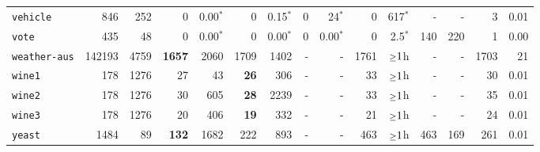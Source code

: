 \begin{tabular}{lccrrrrrrrrrrrr}
\texttt{vehicle} & \multicolumn{1}{r}{846} & \multicolumn{1}{r}{252}  & 0 & 0.00$^*$ & 0 & 0.15$^*$ & 0 & 24$^*$ & 0 & 617$^*$ & - & - & 3 & 0.01\\
\texttt{vote} & \multicolumn{1}{r}{435} & \multicolumn{1}{r}{48}  & 0 & 0.00$^*$ & 0 & 0.00$^*$ & 0 & 0.00$^*$ & 0 & 2.5$^*$ & 140 & 220 & 1 & 0.00\\
\texttt{weather-aus} & \multicolumn{1}{r}{142193} & \multicolumn{1}{r}{4759}  & \textbf{1657} & 2060 & 1709 & 1402 & - & - & 1761 & $\mathsmaller{\geq}1$h & - & - & 1703 & 21\\
\texttt{wine1} & \multicolumn{1}{r}{178} & \multicolumn{1}{r}{1276}  & 27 & 43 & \textbf{26} & 306 & - & - & 33 & $\mathsmaller{\geq}1$h & - & - & 30 & 0.01\\
\texttt{wine2} & \multicolumn{1}{r}{178} & \multicolumn{1}{r}{1276}  & 30 & 605 & \textbf{28} & 2239 & - & - & 33 & $\mathsmaller{\geq}1$h & - & - & 35 & 0.01\\
\texttt{wine3} & \multicolumn{1}{r}{178} & \multicolumn{1}{r}{1276}  & 20 & 406 & \textbf{19} & 332 & - & - & 21 & $\mathsmaller{\geq}1$h & - & - & 24 & 0.01\\
\texttt{yeast} & \multicolumn{1}{r}{1484} & \multicolumn{1}{r}{89}  & \textbf{132} & 1682 & 222 & 893 & - & - & 463 & $\mathsmaller{\geq}1$h & 463 & 169 & 261 & 0.01\\
\bottomrule
\end{tabular}
